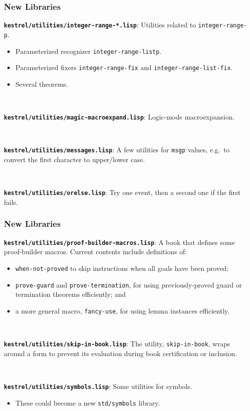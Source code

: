 \documentclass{beamer}
\newcommand{\code}[1]{\texttt{#1}}
\newcommand{\bookpath}[1]{\textbf{\code{#1}}}
\newcommand{\newlibtitle}{\frametitle{New Libraries}}
\begin{document}

\begin{frame}

\newlibtitle

\bookpath{kestrel/utilities/integer-range-*.lisp}:
Utilities related to \code{integer-range-p}.
\begin{itemize}
\item
Parameterized recognizer \code{integer-range-listp}.
\item
Parameterized fixers
\code{integer-range-fix} and \code{integer-range-list-fix}.
\item
Several theorems.
\end{itemize}

\

\bookpath{kestrel/utilities/magic-macroexpand.lisp}:
Logic-mode macroexpansion.

\

\bookpath{kestrel/utilities/messages.lisp}:
A few utilities for \code{msgp} values,
e.g.\ to convert the first character to upper/lower case.

\

\bookpath{kestrel/utilities/orelse.lisp}:
Try one event, then a second one if the first fails.

\end{frame}


\begin{frame}

\newlibtitle

\bookpath{kestrel/utilities/proof-builder-macros.lisp}:
A book that defines some proof-builder macros.  Current contents
include definitions of:
\begin{itemize}
\item
\code{when-not-proved} to skip instructions when all goals have
been proved;
\item
\code{prove-guard} and \code{prove-termination}, for using
previously-proved guard or termination theorems efficiently; and
\item
a more general macro, \code{fancy-use}, for using lemma
instances efficiently.
\end{itemize}

\

\bookpath{kestrel/utilities/skip-in-book.lisp}:
The utility, \code{skip-in-book}, wraps around a form to prevent its
evaluation during book certification or inclusion.

\

\bookpath{kestrel/utilities/symbols.lisp}:
Some utilities for symbols.
\begin{itemize}
\item
These could become a new \code{std/symbols} library.
\end{itemize}

\end{frame}
\end{document}
